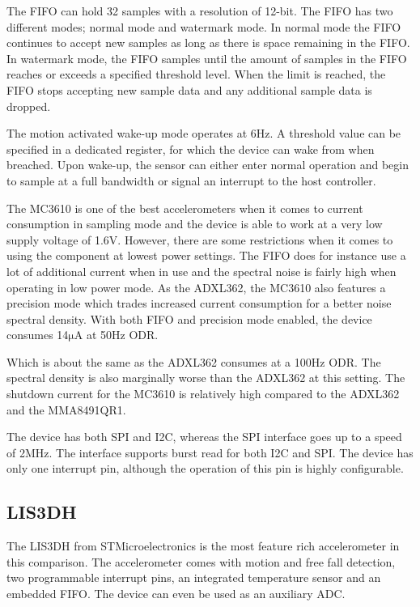 The FIFO can hold 32 samples with a resolution of 12-bit. The FIFO has two different modes; normal mode and watermark mode. In normal mode the FIFO continues to accept new samples as long as there is space remaining in the FIFO. In watermark mode, the FIFO samples until the amount of samples in the FIFO reaches or
exceeds a specified threshold level. When the limit is reached, the FIFO stops accepting new sample
data and any additional sample data is dropped.

The motion activated wake-up mode operates at 6Hz. A threshold value can be specified in a dedicated register, for which the device can wake from when breached. Upon wake-up, the sensor can either enter normal operation and begin to sample at a full bandwidth or signal an interrupt to the host controller.

The MC3610 is one of the best accelerometers when it comes to current consumption in sampling mode and the device is able to work at a very low supply voltage of 1.6V. However, there are some restrictions when it comes to using the component at lowest power settings. The FIFO does for instance use a lot of additional current when in use and the spectral noise is fairly high when operating in low power mode. As the ADXL362, the MC3610 also features a precision mode which trades increased current consumption for a better noise spectral density. With both FIFO and precision mode enabled, the device consumes 14$\si{\micro\ampere}$ at 50Hz ODR. 

Which is about the same as the ADXL362 consumes at a 100Hz ODR. The spectral density is also marginally worse than the ADXL362 at this setting. The shutdown current for the MC3610 is relatively high compared to the ADXL362 and the MMA8491QR1.

The device has both SPI and I2C, whereas the SPI interface goes up to a speed of 2MHz. The interface supports burst read for both I2C and SPI. The device has only one interrupt pin, although the operation of this pin is highly configurable.

\subsection{LIS3DH}

The LIS3DH from STMicroelectronics is the most feature rich accelerometer in this comparison. The accelerometer comes with motion and free fall detection, two programmable interrupt pins, an integrated temperature sensor and an embedded FIFO. The device can even be used as an auxiliary ADC.

